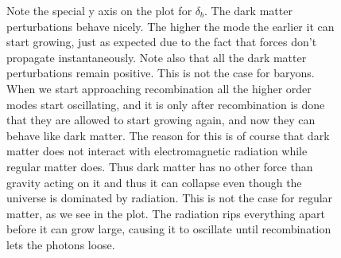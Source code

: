\documentclass[a4paper]{report}
\begin{document}
\begin{figure}[ht]
\caption{Note the special y axis on the plot for $\delta_b$. The dark matter perturbations behave nicely. The higher the mode the earlier it can start growing, just as expected due to the fact that forces don't propagate instantaneously. Note also that all the dark matter perturbations remain positive. This is not the case for baryons. When we start approaching recombination all the higher order modes start oscillating, and it is only after recombination is done that they are allowed to start growing again, and now they can behave like dark matter. The reason for this is of course that dark matter does not interact with electromagnetic radiation while regular matter does. Thus dark matter has no other force than gravity acting on it and thus it can collapse even though the universe is dominated by radiation. This is not the case for regular matter, as we see in the plot. The radiation rips everything apart before it can grow large, causing it to oscillate until recombination lets the photons loose.}
\end{figure}
\end{document}
